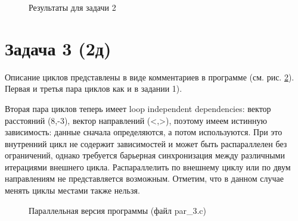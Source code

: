 \documentclass[a4paper,12pt]{article} %
\begin{document}
\begin{figure}[h!]
	\vspace{-10mm}
	\caption{Результаты для задачи 2}
	\label{fig:res_2}
\end{figure}

\section{Задача 3 (2д)}

Описание циклов представлены в виде комментариев в программе (см. рис. \ref{fig:program_3}).
Первая и третья пара циклов как и в задании 1).

Вторая пара циклов теперь имеет loop independent dependencies:
вектор расстояний (8,-3), вектор направлений (<,>), поэтому имеем истинную зависимость: данные сначала определяются, а потом используются.
При это внутренний цикл не содержит зависимостей и может быть распараллелен без ограничений, однако требуется барьерная синхронизация между различными итерациями внешнего цикла.
Распараллелить по внешнему циклу или по двум направлениям не представляется возможным.
Отметим, что в данном случае менять циклы местами также нельзя.

\begin{figure}[h!]
	\caption{Параллельная версия программы (файл par\_3.c)}
	\label{fig:program_3}
\end{figure}
\end{document}
